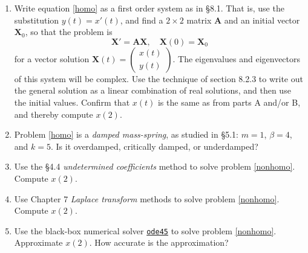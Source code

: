 \documentclass[12pt]{article}
\theoremstyle{definition}
\begin{document}
\begin{enumerate}
\item Write equation \eqref{homo} as a first order system as in \S8.1.  That is, use the substitution $y(t)=x'(t)$, and find a $2\times 2$ matrix $\mathbf{A}$ and an initial vector $\mathbf{X}_0$, so that the problem is
    $$\mathbf{X}' = \mathbf{A} \mathbf{X}, \quad \mathbf{X}(0)=\mathbf{X}_0$$
for a vector solution $\mathbf{X}(t) = \begin{pmatrix} x(t) \\ y(t) \end{pmatrix}$.  The eigenvalues and eigenvectors of this system will be complex.  Use the technique of section 8.2.3 to write out the general solution as a linear combination of real solutions, and then use the initial values.  Confirm that $x(t)$ is the same as from parts A and/or B, and thereby compute $x(2)$.
\item Problem \eqref{homo} is a \emph{damped mass-spring}, as studied in \S5.1: $m=1$, $\beta=4$, and $k=5$.  Is it overdamped, critically damped, or underdamped?
\item Use the \S4.4 \emph{undetermined coefficients} method to solve problem \eqref{nonhomo}.  Compute $x(2)$.
\item Use Chapter 7 \emph{Laplace transform} methods to solve problem \eqref{nonhomo}.  Compute $x(2)$.
\item Use the black-box numerical solver \href{https://www.mathworks.com/help/matlab/ref/ode45.html}{\texttt{ode45}} to solve problem \eqref{nonhomo}.  Approximate $x(2)$.  How accurate is the approximation?
\end{enumerate}
\end{document}
